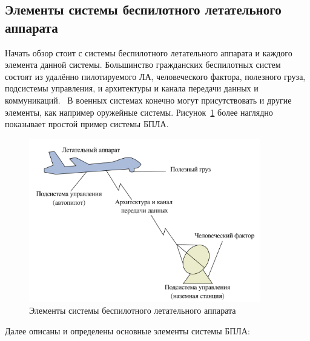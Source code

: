 \documentclass[specification,annotation]{itmo-student-thesis}
\begin{document}
\subsection{Элементы системы беспилотного летательного
аппарата}\label{subsec:uas-elements}

Начать обзор стоит с системы беспилотного летательного аппарата и каждого
элемента данной системы. Большинство гражданских беспилотных систем состоят из
удалённо пилотируемого ЛА, человеческого фактора, полезного груза, подсистемы
управления, и архитектуры и канала передачи данных и
коммуникаций.~\cite{douglas-intro-to-uas} В военных системах конечно могут
присутствовать и другие элементы, как например оружейные системы.
Рисунок~\ref{pic:diag-elems} более наглядно показывает простой пример системы
БПЛА.

\begin{figure}[!h]
  \caption{Элементы системы беспилотного летательного
  аппарата}\label{pic:diag-elems}
  \centering
  \includegraphics[width=0.9\textwidth]{diag-elems}
\end{figure}

Далее описаны и определены основные элементы системы БПЛА:
\end{document}
